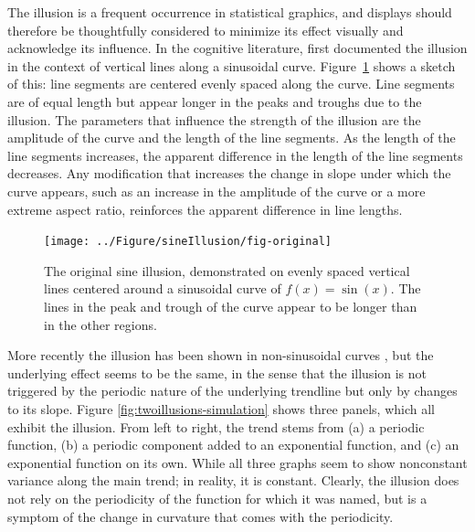 \documentclass[11pt]{isuthesis}\usepackage[]{graphicx}\usepackage[]{color}
\newenvironment{knitrout}{}{} %
\begin{document}
The illusion is a frequent occurrence in statistical graphics, and  displays should therefore be thoughtfully considered to minimize its effect visually and acknowledge its influence. 
In the cognitive literature, \citet{day:1991} first documented the illusion in the context of vertical lines along a sinusoidal curve. Figure~\ref{fig:original} shows a sketch of this: line segments are centered evenly spaced along the curve. Line segments are of equal length but appear longer in the peaks and troughs due to the illusion. The parameters that influence the strength of the illusion are the amplitude of the curve and the length of the line segments. As the length of the line segments increases,  the apparent difference in the length of the line segments decreases. Any modification that increases the change in slope under which the curve appears, such as an increase in the amplitude of the curve or a more extreme aspect ratio, reinforces the apparent difference in line lengths. 







\begin{figure}[hbtp]
\centering
\begin{knitrout}
\color{fgcolor}

{\centering \texttt{[image: ../Figure/sineIllusion/fig-original]} 

}



\end{knitrout}

\caption[The original sine illusion]{The original sine illusion, demonstrated on evenly spaced vertical lines centered around a sinusoidal curve of $f(x) = \sin(x)$. The lines in the peak and trough of the curve appear to be longer than in the other regions.\label{fig:original}}
\end{figure}

More recently the illusion has been shown in non-sinusoidal curves \citep{cleveland:1984, schonlau:2003, robbins:2005, marie:2013}, but the underlying effect seems to be the same, in the sense that the illusion is not triggered by the periodic nature of the underlying trendline but only by  changes to its slope. Figure \ref{fig:twoillusions-simulation} shows three panels, which all exhibit the illusion. From left to right, the trend stems from (a) a periodic function, (b) a periodic component added to an exponential function, and (c) an exponential function on its own.
While all three graphs seem to show nonconstant variance along the main trend; in reality, it is constant. Clearly, the illusion does not rely on the periodicity of the function for which it was named, but is a symptom of the change in curvature that comes with the periodicity.
\end{document}
